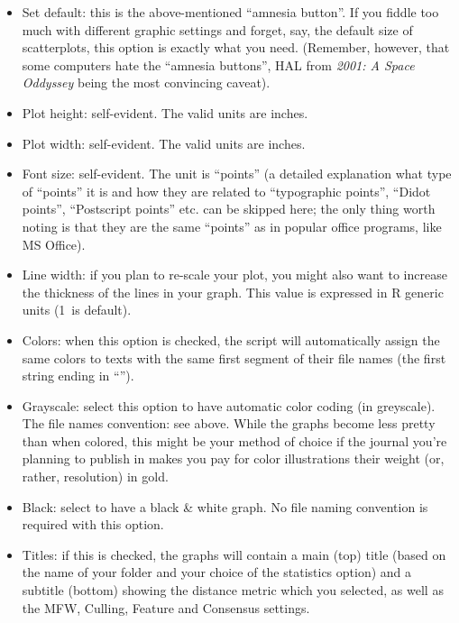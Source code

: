 \documentclass[11pt,a4paper]{article}
\def\underscore{\raisebox{-.8ex}{-}}
\def\margin#1{\marginpar{\textcolor{blue}{\footnotesize\tt #1}}}
\def\code#1{{\tt #1}}
\begin{document}
\begin{itemize}
\item Set default: this is the above-mentioned ``amnesia button''.\margin{plot.options.reset=}\margin{TRUE|FALSE}
If you fiddle too much with different graphic settings and forget,
say, the default size of scatterplots, this option is exactly what
you need. (Remember, however, that some computers hate the ``amnesia
buttons'', HAL from \emph{2001: A Space Oddyssey} being the most convincing
caveat). 

\item Plot height: self-evident. The valid units are inches.\margin{plot.custom.height=} 

\item Plot width: self-evident. The valid units are inches.\margin{plot.custom.width=} 

\item Font size: self-evident.\margin{plot.font.size=}\margin{<integer>}
The unit is ``points'' (a detailed explanation what type of ``points''
it is and how they are related to ``typographic points'', ``Didot points'',
``Postscript points'' etc. can be skipped here; the only thing worth
noting is that they are the same ``points'' as in popular office programs,
like MS Office). 

\item Line width:\margin{plot.line.thickness=}\margin{<integer>} if
you plan to re-scale your plot, you might also want to increase the
thickness of the lines in your graph. This value is expressed in R
generic units (1~is default). 

\item Colors:\margin{colors.on.graphs=}\margin{"colors"}
when this option is checked, the script will automatically assign
the same colors to texts with the same first segment of their file
names (the first string ending in ``{}\code{\underscore}''). 

\item Grayscale:\margin{"grayscale"} select
this option to have automatic color coding (in greyscale). The file
names convention: see above. While the graphs become less pretty than
when colored, this might be your method of choice if the journal you're
planning to publish in makes you pay for color illustrations their
weight (or, rather, resolution) in gold.

\item Black:\margin{"black"} select to have
a black \& white graph. No file naming convention is required with this option. 

\item Titles:\margin{titles.on.graphs=}\margin{TRUE|FALSE} if this
is checked, the graphs will contain a main (top) title (based on the
name of your folder and your choice of the statistics option) and
a subtitle (bottom) showing the distance metric which you selected,
as well as the MFW, Culling, Feature and Consensus settings. 
\end{itemize}
\end{document}
